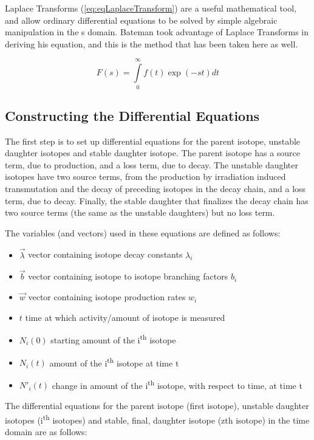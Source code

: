 \documentclass[12pt,twoside]{manual}
\begin{document}
Laplace Transforms (\ref{eq:eqLaplaceTransform}) are a useful mathematical tool, and allow ordinary differential equations to be solved by simple algebraic manipulation in the s domain.  Bateman took advantage of Laplace Transforms in deriving his equation, and this is the method that has been taken here as well.

\begin{equation}
  F(s) = \int \limits_{0}^{\infty} f(t) \exp(-st) dt
  \label{eq:eqLaplaceTransform}
\end{equation}


\subsection{Constructing the Differential Equations}

The first step is to set up differential equations for the parent isotope, unstable daughter isotopes and stable daughter isotope.  The parent isotope has a source term, due to production, and a loss term, due to decay.  The unstable daughter isotopes have two source terms, from the production by irradiation induced transmutation and the decay of preceding isotopes in the decay chain, and a loss term, due to decay.  Finally, the stable daughter that finalizes the decay chain has two source terms (the same as the unstable daughters) but no loss term.

The variables (and vectors) used in these equations are defined as follows:
\begin{itemize}
	\item $\vec{\lambda}$  vector containing isotope decay constants $\lambda_i$
	\item $\vec{b}$  vector containing isotope to isotope branching factors $b_i$
	\item $\vec{w}$  vector containing isotope production rates $w_i$
	\item $t$  time at which activity/amount of isotope is measured
	\item $N_{i}(0)$ starting amount of the i\textsuperscript{th} isotope
	\item $N_{i}(t)$ amount of the i\textsuperscript{th} isotope at time t
	\item $N'_{i}(t)$ change in amount of the i\textsuperscript{th} isotope, with respect to time, at time t
\end{itemize}

The differential equations for the parent isotope (first isotope), unstable daughter isotopes (i\textsuperscript{th} isotopes) and stable, final, daughter isotope (zth isotope) in the time domain are as follows:
\end{document}
